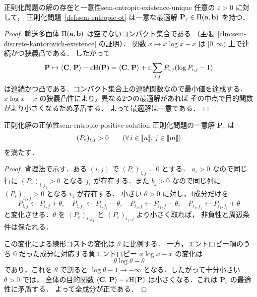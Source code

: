 \begin{proposition}{正則化問題の解の存在と一意性}{sem-entropic-existence-unique}
  任意の $\varepsilon > 0$ に対して，
  正則化問題~\ref{def:sem-entropic-ot} は一意な最適解
  $\mathbf{P}_\varepsilon \in \Pi(\mathbf{a}, \mathbf{b})$ を持つ．
\end{proposition}

\begin{proof}
  輸送多面体 $\Pi(\mathbf{a}, \mathbf{b})$ は空でないコンパクト集合である
  （主張~\ref{clm:sem-discrete-kantorovich-existence} の証明）．
  関数 $x \mapsto x\log x - x$ は $[0,\infty)$ 上で連続かつ狭義凸である．
  したがって
  \[
    \mathbf{P}
    \mapsto
    \langle \mathbf{C},\, \mathbf{P} \rangle - \varepsilon \mathrm{H}(\mathbf{P})
    =
    \langle \mathbf{C},\, \mathbf{P} \rangle
    + \varepsilon \sum_{i,j} P_{i,j}(\log P_{i,j}-1)
  \]
  は連続かつ凸である．コンパクト集合上の連続関数なので最小値を達成する．
  $x\log x-x$ の狭義凸性により，異なる2つの最適解があれば
  その中点で目的関数がより小さくなるため矛盾する．
  よって最適解は一意である．
\end{proof}

\begin{proposition}{正則化解の正値性}{sem-entropic-positive-solution}
  正則化問題の一意解 $\mathbf{P}_\varepsilon$ は
  \[
    (P_\varepsilon)_{i,j} > 0
    \qquad(\forall\, i \in \llbracket n \rrbracket,\, j \in \llbracket m \rrbracket)
  \]
  を満たす．
\end{proposition}

\begin{proof}
  背理法で示す．ある $(i,j)$ で
  $(P_\varepsilon)_{i,j}=0$ とする．
  $a_i>0$ なので同じ行に $(P_\varepsilon)_{i,j_1}>0$ となる
  $j_1$ が存在する．また $b_j>0$ なので同じ列に
  $(P_\varepsilon)_{i_1,j}>0$ となる $i_1$ が存在する．
  小さい $\theta>0$ に対し，4成分だけを
  \[
    P_{i,j} \leftarrow P_{i,j}+\theta,\quad
    P_{i,j_1} \leftarrow P_{i,j_1}-\theta,\quad
    P_{i_1,j} \leftarrow P_{i_1,j}-\theta,\quad
    P_{i_1,j_1} \leftarrow P_{i_1,j_1}+\theta
  \]
  と変化させる．$\theta$ を
  $(P_\varepsilon)_{i,j_1}$ と $(P_\varepsilon)_{i_1,j}$ より小さく取れば，
  非負性と周辺条件は保たれる．

  この変化による線形コストの変化は $\theta$ に比例する．
  一方，エントロピー項のうち $0$ だった成分に対応する負エントロピー
  $x\log x-x$ の変化は
  \[
    \theta\log\theta - \theta
  \]
  であり，これを $\theta$ で割ると $\log\theta-1 \to -\infty$
  となる．したがって十分小さい $\theta>0$ では，
  全体の目的関数
  $\langle \mathbf{C},\, \mathbf{P} \rangle-\varepsilon\mathrm{H}(\mathbf{P})$
  は小さくなる．これは $\mathbf{P}_\varepsilon$ の最適性に矛盾する．
  よって全成分が正である．
\end{proof}


